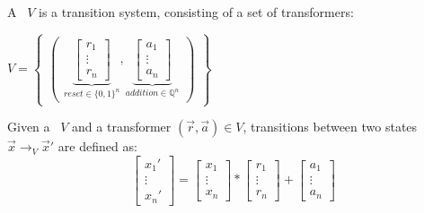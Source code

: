 \documentclass[%
10pt,
dvipsnames,
]{beamer}
\begin{document}
\begin{frame}[t]
	\frametitle{\qvasr}
	\begin{definition}
			A \qvasr\ $V$ is a transition system, consisting of a set of transformers: \\
			\begin{center}
			 $ V = 
			\begin{Bmatrix}
				\begin{pmatrix}
					\underbrace{
					\begin{bmatrix}
						r_1 \\
						\vdots \\
						r_n
					\end{bmatrix}}_{reset \in \{0,1\}^n},
					\underbrace{
					\begin{bmatrix}
						a_1 \\
						\vdots \\
						a_n
					\end{bmatrix}}_{addition \in \mathbb{Q}^n}
				\end{pmatrix}
			\end{Bmatrix}
		$
		\end{center}
	\end{definition}
	\begin{definition}
	Given a \qvasr\ $V$ and a transformer $(\vec{r}, \vec{a}) \in V$, transitions between two states $\vec{x} \rightarrow_V \vec{x}'$ are defined as: \\
	\begin{equation*}
			\begin{bmatrix}
				x_1' \\
				\vdots \\
				x_n'
			\end{bmatrix}
		=
			\begin{bmatrix}
				x_1 \\
				\vdots \\
				x_n
			\end{bmatrix}
		*
			\begin{bmatrix}
			r_1 \\
			\vdots \\
			r_n
			\end{bmatrix}
		+
			\begin{bmatrix}
			a_1 \\
			\vdots \\
			a_n
		\end{bmatrix}		
	\end{equation*}
	\end{definition}
\end{frame}
\end{document}
